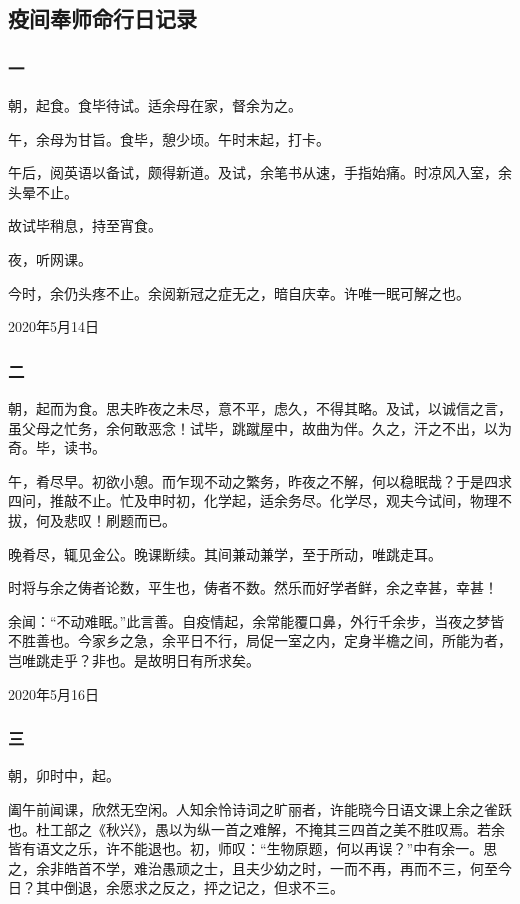 \documentclass[a5paper]{ctexart}
\begin{document}
	\subsection{疫间奉师命行日记录}
	\subsubsection{一}
	朝，起食。食毕待试。适余母在家，督余为之。
	
	午，余母为甘旨。食毕，憩少顷。午时末起，打卡。
	
	午后，阅英语以备试，颇得新道。及试，余笔书从速，手指始痛。时凉风入室，余头晕不止。
	
	故试毕稍息，持至宵食。
	
	夜，听网课。
	
	今时，余仍头疼不止。余阅新冠之症无之，暗自庆幸。许唯一眠可解之也。
	\begin{flushright}
		2020年5月14日
	\end{flushright}
	
	\subsubsection{二}
	朝，起而为食。思夫昨夜之未尽，意不平，虑久，不得其略。及试，以诚信之言，虽父母之忙务，余何敢恶念！试毕，跳蹴屋中，故曲为伴。久之，汗之不出，以为奇。毕，读书。
	
	午，肴尽早。初欲小憩。而乍现不动之繁务，昨夜之不解，何以稳眠哉？于是四求四问，推敲不止。忙及申时初，化学起，适余务尽。化学尽，观夫今试间，物理不拔，何及悲叹！刷题而已。
	
	晚肴尽，辄见金公。晚课断续。其间兼动兼学，至于所动，唯跳走耳。
	
	时将与余之俦者论数，平生也，俦者不数。然乐而好学者鲜，余之幸甚，幸甚！
	
	余闻：“不动难眠。”此言善。自疫情起，余常能覆口鼻，外行千余步，当夜之梦皆不胜善也。今家乡之急，余平日不行，局促一室之内，定身半檐之间，所能为者，岂唯跳走乎？非也。是故明日有所求矣。
	\begin{flushright}
		2020年5月16日
	\end{flushright}
	
	\subsubsection{三}
	朝，卯时中，起。
	
	阖午前闻课，欣然无空闲。人知余怜诗词之旷丽者，许能晓今日语文课上余之雀跃也。杜工部之《秋兴》，愚以为纵一首之难解，不掩其三四首之美不胜叹焉。若余皆有语文之乐，许不能退也。初，师叹：“生物原题，何以再误？”中有余一。思之，余非皓首不学，难治愚顽之士，且夫少幼之时，一而不再，再而不三，何至今日？其中倒退，余愿求之反之，抨之记之，但求不三。
	
\end{document}

